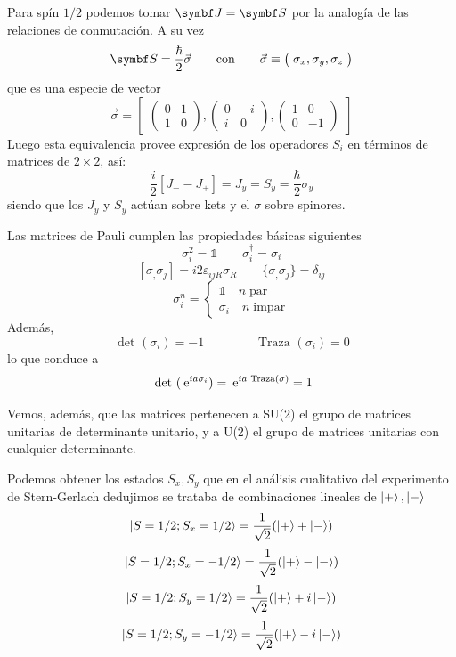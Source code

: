 \documentclass[10pt,oneside]{CBFT_book}
\begin{document}
Para spín $1/2$ podemos tomar $\vb{J} = \vb{S}$ por la analogía de las relaciones de conmutación.
A su vez 
\[
	\vb{S} = \frac{\hbar}{2} \vec{\sigma} \qquad \text{con} \qquad \vec{\sigma} \equiv 
	\begin{pmatrix} \; \sigma_x, \sigma_y, \sigma_z \; \end{pmatrix}
\]
que es una especie de vector 
\[
	\vec{\sigma}  =
	\begin{bmatrix}
	 \begin{pmatrix} 0 & 1 \\ 1 & 0 \end{pmatrix}, 
	 \begin{pmatrix} 0 & -i \\ i & 0 \end{pmatrix},
	 \begin{pmatrix} 1 & 0 \\ 0 & -1 \end{pmatrix} 
	\end{bmatrix}
\]
Luego esta equivalencia provee expresión de los operadores $S_i$ en términos de matrices de $2\times 2$, así:
\[
	\frac{i}{2}[ J_- - J_+] = J_y = S_y = \frac{\hbar}{2} \sigma_y
\]
siendo que los $J_y$ y $S_y$ actúan sobre kets y el $\sigma$ sobre spinores.

Las matrices de Pauli cumplen las propiedades básicas siguientes 
\[
	\sigma^2_i = \mathbb{1} \qquad \sigma_i^\dagger = \sigma_i
\]
\[
	[ \sigma_, \sigma_j ] = i2\varepsilon_{ijR}\sigma_R \qquad \{\sigma_, \sigma_j \}= \delta_{ij}
\]
\[
	\sigma_i^n = \begin{cases} 
		\mathbb{1} \quad n \; \text{par} \\ 
		\sigma_i \quad n \; \text{impar} 
		\end{cases}
\]
Además, 
\[
	\text{ det }(\sigma_i) = -1 \qquad \qquad \text{ Traza }(\sigma_i) = 0
\]
lo que conduce a
\[
	\text{ det }( \:\mathrm{e}^{ i a \sigma_i} ) =  \:\mathrm{e}^{i a \text{ Traza}(\sigma) } = 1
\]

Vemos, además, que las matrices pertenecen a SU(2) el grupo de matrices unitarias de
determinante unitario, y a U(2) el grupo de matrices unitarias con cualquier determinante.

Podemos obtener los estados $S_x, S_y$ que en el análisis cualitativo del experimento de Stern-Gerlach
dedujimos se trataba de combinaciones lineales de $\Ket{+}, \Ket{-}$
\[
	\Ket{S=1/2 ; S_x = 1/2} = \frac{1}{\sqrt{2}}( \Ket{+} + \Ket{-})
\]
\[
	\Ket{S=1/2 ; S_x = -1/2} = \frac{1}{\sqrt{2}}( \Ket{+} - \Ket{-})
\]
\[
	\Ket{S=1/2 ; S_y = 1/2} = \frac{1}{\sqrt{2}}( \Ket{+} + i\Ket{-})
\]
\[
	\Ket{S=1/2 ; S_y = -1/2} = \frac{1}{\sqrt{2}}( \Ket{+} - i\Ket{-})
\]
\end{document}
